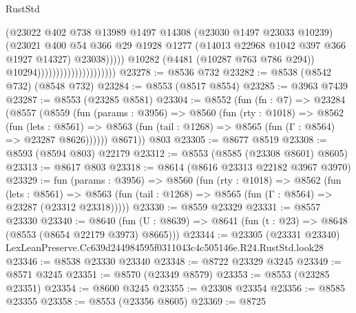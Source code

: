\begin{lexlean}{RustStd}
\begin{coremodule}
                                                    (@23022
                                                      @402
                                                      @738
                                                      @13989
                                                      @1497
                                                      @14308
                                                      (@23030 @1497 @23033 @10239)
                                                      (@23021
                                                        @400
                                                        @54
                                                        @366
                                                        @29
                                                        @1928
                                                        @1277
                                                        (@14013 @22968 @1042 @397 @366 @1927 @14327)
                                                        @23038)))))
                                              @10282
                                              (@4481 (@10287 @763 @786 @294))
                                              @10294)))))))))))))))))))))
@23278 := @8536 @732
@23282 := @8538 (@8542 @732) (@8548 @732)
@23284 := @8553 (@8517 @8554)
@23285 := @3963 @7439
@23287 := @8553 (@23285 @8581)
@23304 := @8552
    (fun (fn : @7) =>
    @23284
      (@8557
        (@8559
          (fun (params : @3956) =>
          @8560
            (fun (rty : @1018) =>
            @8562
              (fun (lets : @8561) =>
              @8563 (fun (tail : @1268) => @8565 (fun (Γ : @8564) => @23287 @8626))))))
        @8671))
    @803
@23305 := @8677 @8519
@23308 := @8593 (@8594 @803) @22179
@23312 := @8553 (@8585 (@23308 @8601) @8605)
@23313 := @8617 @803
@23318 := @8614 (@8616 @23313 @22182 @3967 @3970)
@23329 := fun (params : @3956) =>
  @8560
    (fun (rty : @1018) =>
    @8562
      (fun (lets : @8561) =>
      @8563 (fun (tail : @1268) => @8565 (fun (Γ : @8564) => @23287 (@23312 @23318)))))
@23330 := @8559 @23329
@23331 := @8557 @23330
@23340 := @8640
    (fun (U : @8639) => @8641 (fun (t : @23) => @8648 (@8553 (@8654 @22179 @3973) @8665)))
@23344 := @23305
    (@23331 @23340)
    LexLeanPreserve.Cc639d244984595f0311043c4c505146e.R24.RustStd.look28
@23346 := @8538 @23330 @23340
@23348 := @8722 @23329 @3245
@23349 := @8571 @3245
@23351 := @8570 (@23349 @8579)
@23353 := @8553 (@23285 @23351)
@23354 := @8600 @3245
@23355 := @23308 @23354
@23356 := @8585 @23355
@23358 := @8553 (@23356 @8605)
@23369 := @8725

\end{coremodule}
\end{lexlean}
